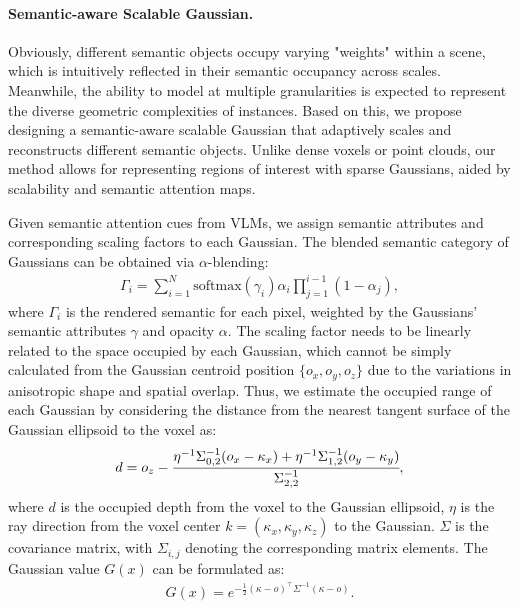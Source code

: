\paragraph{Semantic-aware Scalable Gaussian.} 
Obviously, different semantic objects occupy varying "weights" within a scene, which is intuitively reflected in their semantic occupancy across scales. Meanwhile, the ability to model at multiple granularities is expected to represent the diverse geometric complexities of instances. Based on this, we propose designing a semantic-aware scalable Gaussian that adaptively scales and reconstructs different semantic objects. Unlike dense voxels or point clouds, our method allows for representing regions of interest with sparse Gaussians, aided by scalability and semantic attention maps.

Given semantic attention cues from VLMs, we assign semantic attributes and corresponding scaling factors to each Gaussian. The blended semantic category of Gaussians can be obtained via $\alpha$-blending:
\begin{equation}
\begin{aligned}
    \Gamma_i = \sum_{i=1}^{N} \mathrm{softmax}(\gamma_i) \alpha_{i} \prod_{j=1}^{i-1}(1-\alpha_{j}) ,
\end{aligned}
\end{equation}
where $\Gamma_i$ is the rendered semantic for each pixel, weighted by the Gaussians' semantic attributes $\gamma$ and opacity $\alpha$. 
%
The scaling factor needs to be linearly related to the space occupied by each Gaussian, which cannot be simply calculated from the Gaussian centroid position $\{o_x,o_y,o_z\}$ due to the variations in anisotropic shape and spatial overlap. Thus, we estimate the occupied range of each Gaussian by considering the distance from the nearest tangent surface of the Gaussian ellipsoid to the voxel as:
\begin{equation}
\begin{aligned}
    d = o_z - \cfrac{\eta^{-1}\Sigma_{0,2}^{-1}(o_x - \kappa_x) + \eta^{-1}\Sigma_{1,2}^{-1}(o_y - \kappa_y)}{\Sigma_{2,2}^{-1}} ,
\end{aligned}
\end{equation}
where $d$ is the occupied depth from the voxel to the Gaussian ellipsoid, $\eta$ is the ray direction from the voxel center $k =(\kappa_x, \kappa_y, \kappa_z)$ to the Gaussian. $\Sigma$ is the covariance matrix, with $\Sigma_{i,j}$ denoting the corresponding matrix elements.
%
The Gaussian value $G(x)$ can be formulated as:
\begin{equation}
\begin{aligned}
    G(x) = e^{-\frac{1}{2}(\kappa-o)^{\top}\Sigma^{-1}(\kappa-o)} .
\end{aligned}
\end{equation}
